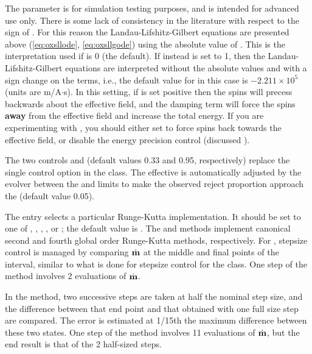 \begin{description}
The  parameter is for simulation testing
purposes, and is intended for advanced use only.  There is some lack of
consistency in the literature with respect to the sign of
\abovemath{\gamma}.  For this reason the Landau-Lifshitz-Gilbert
equations are presented above (\ref{eq:oxsllode}, \ref{eq:oxsllgode})
using the absolute value of \abovemath{\gamma}.  This is the
interpretation used if  is 0 (the default).  If
instead  is set to 1, then the
Landau-Lifshitz-Gilbert equations are interpreted without the absolute
values and with a sign change on the \abovemath{\gamma} terms, i.e., the
default value for \abovemath{\gamma} in this case is $-2.211 \times
10^5$ (units are m/A$\cdot$s).  In this setting, if \abovemath{\gamma}
is set positive then the spins will precess backwards about the
effective field, and the damping term will force the spins \textbf{away}
from the effective field and increase the total energy.  If you are
experimenting with , you should either set
 to force spins back towards the effective field,
or disable the energy precision control (discussed
).

The two controls  and
 (default values 0.33 and 0.95,
respectively) replace the single  control option
in the  class.  The effective  is
automatically adjusted by the evolver between the 
and  limits to make the observed reject proportion
approach the  (default value 0.05).

The  entry selects a particular Runge-Kutta
implementation.  It should be set to one of ,
, , , or ;
the default value is .  The  and
 methods implement canonical second and fourth global order
Runge-Kutta methods\cite{stoer1993}, respectively.  For ,
stepsize control is managed by comparing $\dot{\textbf{m}}$ at the middle and
final points of the interval, similar to what is done for stepsize
control for the  class.  One step of the
 method involves 2 evaluations of $\dot{\textbf{m}}$.

In the  method, two successive steps are taken at half the
nominal step size, and the difference between that end point and that
obtained with one full size step are compared.  The error is estimated at
1/15th the maximum difference between these two states.  One step of the
 method involves 11 evaluations of $\dot{\textbf{m}}$, but the
end result is that of the 2 half-sized steps.


\end{description}
